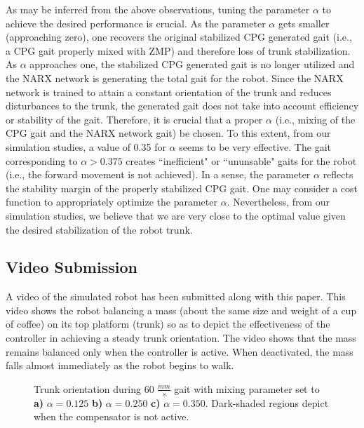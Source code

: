 As may be inferred from the above observations, tuning the parameter $\alpha$ to achieve the desired performance is crucial. 
As the parameter $\alpha$ gets smaller (approaching zero), one recovers the original stabilized CPG generated gait (i.e., a CPG gait properly mixed
with ZMP) and therefore loss of trunk stabilization. As $\alpha$ approaches one, the stabilized CPG generated gait is no longer utilized and the NARX network
is generating the total gait for the robot. Since the NARX network is trained to attain a constant orientation of the trunk and reduces disturbances to 
the trunk, the generated gait does not take into account efficiency or  stability of the gait. Therefore, it is crucial that a proper $\alpha$ (i.e., mixing of the CPG gait
and the NARX network gait) be chosen. To this extent, from our simulation studies, a value of 0.35 for $\alpha$ seems to be very effective. The gait corresponding
to $\alpha > 0.375$ creates ``inefficient" or ``ununsable" gaits for the robot (i.e., the forward movement is not achieved). In a sense, the parameter $\alpha$
reflects the stability margin of the properly stabilized CPG gait. One may consider a cost function to appropriately optimize the parameter $\alpha$. Nevertheless,
from our simulation studies, we believe that we are very close to the optimal value given the desired stabilization of the robot trunk.


\vspace{-2mm}
\subsection{Video Submission}


A video of the simulated robot has been submitted along with this paper. This video shows the robot balancing a mass 
(about the same size and weight of a cup of coffee) on its top platform (trunk) so as to depict the effectiveness of the
 controller in achieving a steady trunk orientation. The video shows that the mass remains balanced only when the controller 
is active. When deactivated, the mass falls almost immediately as the robot begins to walk. 
%
%
%
\begin{figure}[t!]
	\centering
	\begin{subfigure}{0.475\textwidth}
		\centering
		\caption{ }
	\end{subfigure}
	\begin{subfigure}{0.475\textwidth}
		\centering
		\caption{ }
	\end{subfigure}
	\begin{subfigure}{0.475\textwidth}
		\centering
		\caption{ }
	\end{subfigure}
	\caption{ Trunk orientation during 60 $\frac{mm}{s}$ gait with mixing parameter set to
		 \textbf{a)}  $\alpha = 0.125$ 
		 \textbf{b)}  $\alpha = 0.250$ 
		 \textbf{c)}  $\alpha = 0.350$.
		Dark-shaded regions depict when the compensator is not active.
	}
	\label{fig::alpha_tests}
	\vspace{-6mm}
\end{figure}


